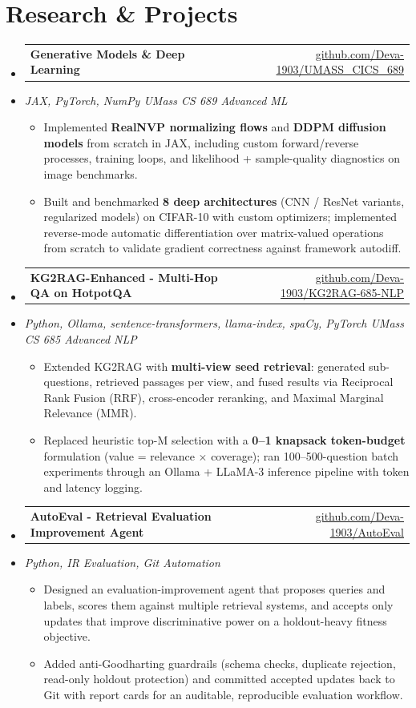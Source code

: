 \documentclass[letterpaper,10pt]{article}
\makeatletter
\newcommand{\resumeItem}[1]{
  \item\small{#1\vspace{-1pt}}
}
\newcommand{\resumeProjectHeading}[2]{
    \item
    \begin{tabular*}{0.985\textwidth}[t]{l@{\extracolsep{\fill}}r}
      \small\textbf{#1} & \small #2 \\
    \end{tabular*}\vspace{-5pt}
}
\newcommand{\resumeProjectSubheading}[1]{
  \vspace{-2pt}\item[] {\small\textcolor{ResumeSlate}{\emph{#1}}}\vspace{-3pt}
}
\newcommand{\resumeSubHeadingListStart}{\begin{itemize}[leftmargin=0.0in, label={}, itemsep=2pt, topsep=2pt]}
\newcommand{\resumeSubHeadingListEnd}{\end{itemize}}
\newcommand{\resumeItemListStart}{\begin{itemize}[leftmargin=0.18in, itemsep=2pt, topsep=1pt]}
\newcommand{\resumeItemListEnd}{\end{itemize}\vspace{-4pt}}
\makeatother
\begin{document}
\section{Research \& Projects}
\resumeSubHeadingListStart
  \resumeProjectHeading
    {Generative Models \& Deep Learning}
    {\href{https://github.com/Deva-1903/UMASS_CICS_689}{github.com/Deva-1903/UMASS\_CICS\_689}}
  \resumeProjectSubheading{JAX, PyTorch, NumPy \enspace\textbar\enspace UMass CS 689 Advanced ML}
    \resumeItemListStart
      \resumeItem{Implemented \textbf{RealNVP normalizing flows} and \textbf{DDPM diffusion models} from scratch in JAX, including custom forward/reverse processes, training loops, and likelihood + sample-quality diagnostics on image benchmarks.}
      \resumeItem{Built and benchmarked \textbf{8 deep architectures} (CNN / ResNet variants, regularized models) on CIFAR-10 with custom optimizers; implemented reverse-mode automatic differentiation over matrix-valued operations from scratch to validate gradient correctness against framework autodiff.}
    \resumeItemListEnd
  \resumeProjectHeading
    {KG2RAG-Enhanced - Multi-Hop QA on HotpotQA}
    {\href{https://github.com/Deva-1903/KG2RAG-685-NLP}{github.com/Deva-1903/KG2RAG-685-NLP}}
  \resumeProjectSubheading{Python, Ollama, sentence-transformers, llama-index, spaCy, PyTorch \enspace\textbar\enspace UMass CS 685 Advanced NLP}
    \resumeItemListStart
      \resumeItem{Extended KG2RAG with \textbf{multi-view seed retrieval}: generated sub-questions, retrieved passages per view, and fused results via Reciprocal Rank Fusion (RRF), cross-encoder reranking, and Maximal Marginal Relevance (MMR).}
      \resumeItem{Replaced heuristic top-M selection with a \textbf{0--1 knapsack token-budget} formulation (value = relevance \(\times\) coverage); ran 100--500-question batch experiments through an Ollama + LLaMA-3 inference pipeline with token and latency logging.}
    \resumeItemListEnd
  \resumeProjectHeading
    {AutoEval - Retrieval Evaluation Improvement Agent}
    {\href{https://github.com/Deva-1903/AutoEval}{github.com/Deva-1903/AutoEval}}
  \resumeProjectSubheading{Python, IR Evaluation, Git Automation}
    \resumeItemListStart
      \resumeItem{Designed an evaluation-improvement agent that proposes queries and labels, scores them against multiple retrieval systems, and accepts only updates that improve discriminative power on a holdout-heavy fitness objective.}
      \resumeItem{Added anti-Goodharting guardrails (schema checks, duplicate rejection, read-only holdout protection) and committed accepted updates back to Git with report cards for an auditable, reproducible evaluation workflow.}
    \resumeItemListEnd
\resumeSubHeadingListEnd
\vspace{-4pt}
\end{document}
